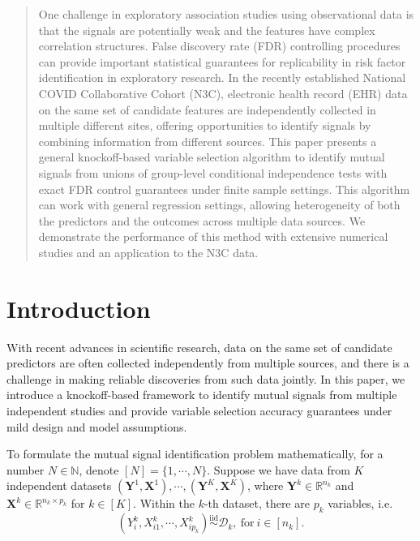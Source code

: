 \documentclass[11pt]{article}
\theoremstyle{plain}
\theoremstyle{definition}
\theoremstyle{remark}
\def\R{\mathbb{R}}
\def\R{\mathbb{R}}
\newcommand{\X}{\mathbf{X}}
\newcommand{\Y}{\mathbf{Y}}
\newcommand{\0}{\mathbf{0}}
\newcommand{\iidsim}{\stackrel{\mathrm{iid}}{\sim}}
\begin{document}
\begin{abstract}

One challenge in exploratory association studies using observational data is that the signals are potentially weak and the features have complex correlation structures. False discovery rate (FDR) controlling procedures can provide important statistical guarantees for replicability in risk factor identification in exploratory research. In the recently established National COVID Collaborative Cohort (N3C), electronic health record (EHR) data on the same set of candidate features are independently collected in multiple different sites, offering opportunities to identify signals by combining information from different sources. This paper presents a general knockoff-based variable selection algorithm to identify mutual signals from unions of group-level conditional independence tests with exact FDR control guarantees under finite sample settings. This algorithm can work with general regression settings, allowing heterogeneity of both the predictors and the outcomes across multiple data sources. We demonstrate the performance of this method with extensive numerical studies and an application to the N3C data.
\end{abstract}

\section{Introduction}
\label{sec:intro}

 With recent advances in scientific research, data on the same set of candidate predictors are often collected independently from multiple sources, and there is a challenge in making reliable discoveries from such data jointly. In this paper, we introduce a knockoff-based framework to identify mutual signals from multiple independent studies and provide variable selection accuracy guarantees under mild design and model assumptions.
 
 To formulate the mutual signal identification problem mathematically, for a number $N \in \mathbb{N}$, denote $[N] = \{1, \cdots, N\}$. Suppose we have data from $K$ independent datasets $(\Y^1,\X^1),$$\cdots,$$ (\Y^K,\X^K)$, where $\Y^{k}\in \R^{n_k}$ and $\X^k\in \R^{n_k\times p_k}$ for $k \in [K]$. Within the $k$-th dataset, there are $p_k$ variables, i.e. 
 \[(Y^k_{i},X^k_{i1},\cdots,X^k_{ip_k}) \iidsim \mathcal{D}_k, ~\text{for}~ i \in [n_k].\] 
 
\end{document}
